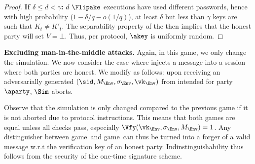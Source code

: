 \begin{games}
\begin{proof}
\textbf{If $\delta\leq d < \gamma$:}
$d$ $\Flipake$ executions have used different passwords, hence with high probability ($1-\delta/q-o(1/q)$), at least $\delta$ but less than $\gamma$ keys are such that $K_t \neq K'_t$.
The separability property of the \WRSS then implies that the honest party will set $V = \bot$.
Thus, per protocol, $\akey$ is uniformly random.
\end{proof}

\textbf{Excluding man-in-the-middle attacks.}
Again, in this game, we only change the simulation. We now consider the case where \Env injects a message into a session where both parties are honest. We modify \Sim as follows: upon receiving an adversarially generated $(\sid,M_\Env,\sigma_\Env,\vk_\Env)$ from \Env intended for party $\aparty$, $\Sim$ aborts.

Observe that the simulation is only changed compared to the previous game if it is not aborted due to protocol instructions. This means that both games are equal unless all checks pass, especially $\Vfy(\vk_\Env,\sigma_\Env,M_\Env)=1$. Any distinguisher between game~\thisgame and game~\previousgame can thus be turned into a forger of a valid message w.r.t the verification key of an honest party. Indinstinguishability thus follows from the security of the one-time signature scheme.


\end{games}
